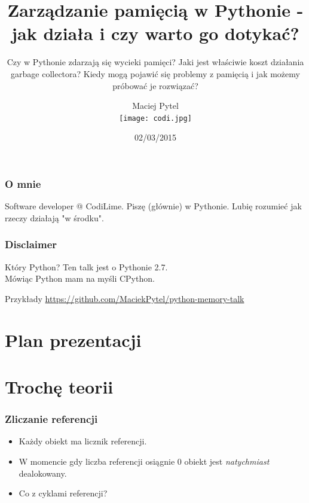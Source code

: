 \documentclass{beamer}
\title[Zarządzanie pamięcią w Pythonie]{Zarządzanie pamięcią w Pythonie - jak działa i czy warto go dotykać?}
\subtitle{Czy w Pythonie zdarzają się wycieki pamięci? Jaki jest właściwie koszt działania garbage collectora? Kiedy mogą pojawić się problemy z pamięcią i jak możemy próbować je rozwiązać?}
\author[Maciej Pytel]{Maciej Pytel\\ \texttt{[image: codi.jpg]}\vspace{-4ex}}
\date{02/03/2015}
\begin{document}

\begin{frame}
  \begin{titlepage}
  \end{titlepage}
\end{frame}

\begin{frame}
    \frametitle{O mnie}
    Software developer @ CodiLime. Piszę (głównie) w Pythonie. Lubię rozumieć jak rzeczy działają "w środku".
\end{frame}

\begin{frame}
    \frametitle{Disclaimer}
    \begin{block}{Który Python?}
        Ten talk jest o Pythonie 2.7.\\
        Mówiąc Python mam na myśli CPython.
    \end{block}
    \begin{block}{Przykłady}
        \url{https://github.com/MaciekPytel/python-memory-talk}
    \end{block}
\end{frame}

\section*{Plan prezentacji}
    \begin{frame}
      \tableofcontents
    \end{frame}

\setcounter{section}{0}
\section{Trochę teorii}
\frame\sectionpage
    \begin{frame}
        \frametitle{Zliczanie referencji}
        \begin{itemize}
            \item Każdy obiekt ma licznik referencji.
            \item W momencie gdy liczba referencji osiągnie 0 obiekt jest \textit{natychmiast} dealokowany.
            \item Co z cyklami referencji?
        \end{itemize}
    \end{frame}
\end{document}
